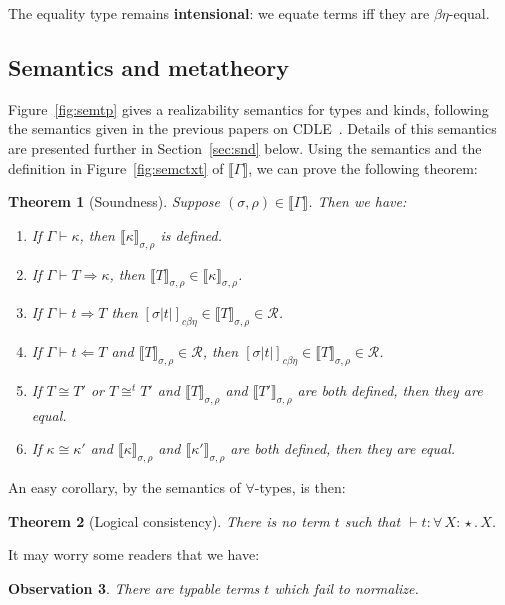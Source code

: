 \documentclass{article}
\newcommand{\abs}[4]{{#1}\, #2\! : \! #3.\, #4}
\newcommand{\interp}[1]{\llbracket #1 \rrbracket}
\newcommand{\tpcheck}[0]{\Leftarrow}
\newcommand{\tpsynth}[0]{\Rightarrow}
\newcommand{\cbe}[0]{c\beta\eta}
\newtheorem{theorem}{Theorem}
\newtheorem{observation}[theorem]{Observation}
\begin{document}
The equality type remains \textbf{intensional}: we equate terms iff they are $\beta\eta$-equal.  

\subsection{Semantics and metatheory}

Figure~\ref{fig:semtp} gives a realizability semantics for types and
kinds, following the semantics given in the previous papers on
CDLE~\cite{stump18,stump17}.  Details of this semantics are presented
further in Section~\ref{sec:snd} below.  Using the semantics and the
definition in Figure~\ref{fig:semctxt} of $\interp{\Gamma}$, we can
prove the following theorem:
\begin{theorem}[Soundness]
\label{thm:snd}
Suppose $(\sigma,\rho)\in\interp{\Gamma}$.  Then we have:
\begin{enumerate}
\item If $\Gamma\vdash \kappa$, then $\interp{\kappa}_{\sigma,\rho}$ is defined.
\item If $\Gamma\vdash T \tpsynth \kappa$, then $\interp{T}_{\sigma,\rho}\in\interp{\kappa}_{\sigma,\rho}$.
\item If $\Gamma\vdash t \tpsynth T$ then $[\sigma |t|]_{\cbe}\in\interp{T}_{\sigma,\rho}\in \mathcal{R}$.
\item If $\Gamma\vdash t \tpcheck T$ and $\interp{T}_{\sigma,\rho}\in \mathcal{R}$, then
    $[\sigma |t|]_{\cbe}\in\interp{T}_{\sigma,\rho}\in \mathcal{R}$.
\item If $T \cong T'$ or $T \cong^t T'$ and $\interp{T}_{\sigma,\rho}$ and $\interp{T'}_{\sigma,\rho}$ are both defined, then they are equal.
\item If \(\kappa \cong \kappa'\) and \(\interp{\kappa}_{\sigma,\rho}\) and
  \(\interp{\kappa'}_{\sigma,\rho}\) are both defined, then they are equal.
\end{enumerate}
\end{theorem}

An easy corollary, by the semantics of $\forall$-types, is then:

\begin{theorem}[Logical consistency]
\label{thm:consis}
  There is no term $t$ such that $\vdash t : \abs{\forall}{X}{\star}{X}$.
\end{theorem}

It may worry some readers that we have:
\begin{observation}
  There are typable terms $t$ which fail to normalize.
\end{observation}
\end{document}
